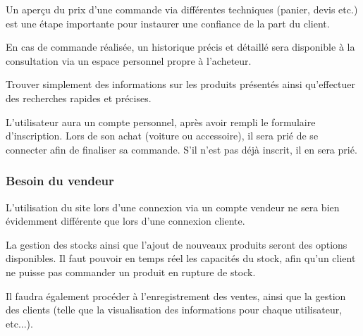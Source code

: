 \documentclass[a4paper]{article}
\begin{document}
	Un aperçu du prix d'une commande via différentes techniques (panier, devis etc.) est une étape importante pour instaurer une confiance de la part du client.
	
	En cas de commande réalisée, un historique précis et détaillé sera disponible à la consultation via un espace personnel propre à l'acheteur.
	
	Trouver simplement des informations sur les produits présentés ainsi qu'effectuer des recherches rapides et précises. 
	
	L'utilisateur aura un compte personnel, après avoir rempli le formulaire d'inscription. Lors de son achat (voiture ou accessoire), il sera prié de se connecter afin de finaliser sa commande. S'il n'est pas déjà inscrit, il en sera prié.
	
		\subsubsection{Besoin du vendeur}
		L'utilisation du site lors d'une connexion via un compte vendeur ne sera bien évidemment différente que lors d'une connexion cliente.
		
		La gestion des stocks ainsi que l'ajout de nouveaux produits seront des options disponibles. Il faut pouvoir en temps réel les capacités du stock, afin qu'un client ne puisse pas commander un produit en rupture de stock.
		
		Il faudra également procéder à l'enregistrement des ventes, ainsi que la gestion des clients (telle que la visualisation des informations pour chaque utilisateur, etc...). 
\end{document}
